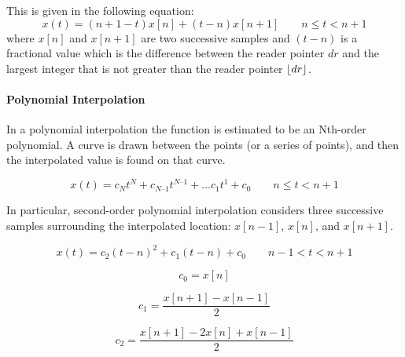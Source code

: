 This is given in the following equation:
\[
 x(t) = (n + 1 - t)x[n] + (t-n)x[n+1] \qquad n \leq t< n + 1
\]
where $x[n]$ and $x[n+1]$ are two successive  samples and $ (t-n) $ is a fractional value which is the difference between the reader pointer $dr$ and the largest integer that is not greater than the reader pointer $\lfloor dr\rfloor$.

\paragraph{Polynomial Interpolation}
In a polynomial interpolation the function is estimated to be an Nth-order polynomial. A curve is drawn between the points (or a series of points), and then the interpolated value is found on that curve.~\cite{pirkle2013designing}

\[
 x(t) = c_{N}t^{N} + c_{N–1}t^{N–1} + ... c_{1}t^{1} + c_{0} \qquad n \leq t< n + 1
 \]

In particular, second-order polynomial interpolation considers three successive samples surrounding the interpolated location: $x[n-1]$, $x[n]$, and $x[n+1]$. 

\[
x(t) = c_{2}(t-n)^{2} + c_{1}(t-n) + c_{0} \qquad n - 1 < t < n + 1
\]

\[
c_{0} = x[n]
\]

\[
c_{1} = \frac{x[n+1] - x[n-1]}{2}
\]

\[
c_{2} = \frac{x[n+1] - 2x[n] + x[n-1]}{2}
\]



